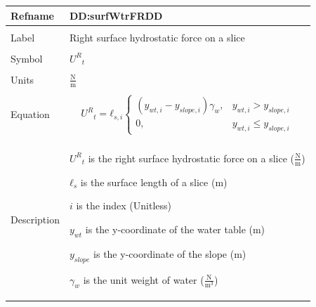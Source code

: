 \documentclass[12pt]{article}
\begin{document}
\noindent \begin{minipage}{\textwidth}
\begin{tabular}{p{} p{}}
\toprule \textbf{Refname} & \textbf{DD:surfWtrFRDD}
\label{DD:surfWtrFRDD}
\\ \midrule \\
Label & Right surface hydrostatic force on a slice
        \\ \midrule \\
        Symbol & ${{U^{R}}_{t}}$
                 \\ \midrule \\
                 Units & $\frac{\text{N}}{\text{m}}$
                         \\ \midrule \\
                         Equation & \begin{displaymath}
                                    {{U^{R}}_{t}}={ℓ_{s,i}} \begin{cases}
\left({y_{wt,i}}-{y_{slope,i}}\right) {γ_{w}}, & {y_{wt,i}}>{y_{slope,i}}\\
0, & {y_{wt,i}}\leq{}{y_{slope,i}}
\end{cases}
                                    \end{displaymath}
                                    \\ \midrule \\
                                    Description & \begin{symbDescription}
                                                  \item{${{U^{R}}_{t}}$ is the right surface hydrostatic force on a slice ($\frac{\text{N}}{\text{m}}$)}
                                                  \item{${ℓ_{s}}$ is the surface length of a slice (m)}
                                                  \item{$i$ is the index (Unitless)}
                                                  \item{${y_{wt}}$ is the y-coordinate of the water table (m)}
                                                  \item{${y_{slope}}$ is the y-coordinate of the slope (m)}
                                                  \item{${γ_{w}}$ is the unit weight of water ($\frac{\text{N}}{\text{m}^{3}}$)}
                                                  \end{symbDescription}

\end{tabular}
\end{minipage}
\end{document}
